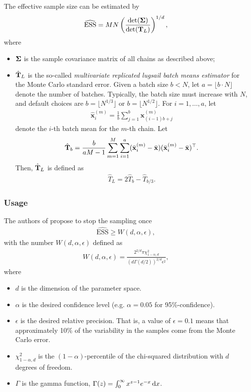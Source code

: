 \documentclass[10pt]{article}
\numberwithin{equation}{section}
\begin{document}
The effective sample size can be estimated by
\begin{align*}
\widehat {\mathrm{ESS}} = MN \left(\frac{\det(\mathbf{\Sigma})}{\det(\mathbf{T}_L)} \right)^{1/d},
\end{align*}
where
\begin{itemize}
\item $\mathbf{\Sigma}$ is the sample covariance matrix of all chains as described above;
\item $\hat{\mathbf{T}}_L$ is the so-called \emph{multivariate replicated lugsail batch means estimator} for the Monte Carlo standard error. Given a batch size $b < N$, let $a = \lfloor b \cdot N \rfloor$ denote the number of batches. Typically, the batch size must increase with $N$, and default choices are $b = \lfloor N^{1/3} \rfloor$ or $b = \lfloor N^{1/2} \rfloor$. For $i = 1,\ldots, a$, let
\begin{align*}
\hat{\bm x}_i^{(m)} = \frac{1}{b} \sum_{j=1}^b \bm x_{(i-1)b + j}^{(m)}
\end{align*}
denote the $i$-th batch mean for the $m$-th chain. Let
\begin{align*}
\hat{\mathbf{T}}_b = \frac{b}{aM - 1} \sum_{m=1}^M \sum_{i=1}^a (\bar{\mathbf{x}}_i^{(m)} - \bar{\mathbf{x}})(\bar{\mathbf{x}}_i^{(m)} - \bar{\mathbf{x}})^\top.
\end{align*}
Then, $\hat{\mathbf{T}}_L$ is defined as
\begin{align*}
\hat T_L = 2 \hat T_b - \hat T_{b/3}.
\end{align*}
\end{itemize}

\subsubsection*{Usage}

The authors of \cite{VatFleJon19} propose to stop the sampling once
\begin{align*}
\widehat{\mathrm{ESS}} \geq W(d, \alpha, \epsilon),
\end{align*}
with the number $W(d, \alpha, \epsilon)$ defined as 
\begin{align}
W(d, \alpha, \epsilon) = \frac{2^{2/d} \pi \chi^2_{1-\alpha,d}}{(d \Gamma(d/2))^{2/d} \epsilon^2}, \label{eq:w_d_alpha_epsilon}
\end{align}
where
\begin{itemize}
\item $d$ is the dimension of the parameter space.
\item $\alpha$ is the desired confidence level (e.g. $\alpha=0.05$ for 95\%-confidence).
\item $\epsilon$ is the desired relative precision. That is, a value of $\epsilon=0.1$ means that approximately 10\% of the variability in the samples come from the Monte Carlo error.
\item $\chi^2_{1-\alpha, d}$ is the $(1-\alpha)$-percentile of the chi-squared distribution with $d$ degrees of freedom.
\item $\Gamma$ is the gamma function, $\Gamma(z) = \int_0^\infty x^{z-1} e^{-x} \,\mathrm d x$.
\end{itemize}
\end{document}
